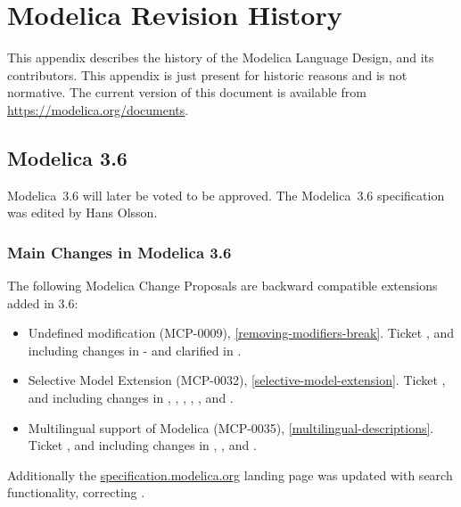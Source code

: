\chapter{Modelica Revision History}\label{modelica-revision-history}

This appendix describes the history of the Modelica Language Design, and its contributors.
This appendix is just present for historic reasons and is not normative.
The current version of this document is available from \url{https://modelica.org/documents}.

\section{Modelica 3.6}\label{modelica-3-6}

Modelica~3.6 will later be voted to be approved.
The Modelica~3.6 specification was edited by Hans Olsson.

\subsection{Main Changes in Modelica 3.6}\label{main-changes-in-modelica-3-6}

The following Modelica Change Proposals are backward compatible extensions added in 3.6:
\begin{itemize}
\item Undefined modification (MCP-0009), \cref{removing-modifiers-break}.
Ticket , and including changes in  - and clarified in .
\item Selective Model Extension (MCP-0032), \cref{selective-model-extension}.
Ticket , and including changes in , , , , , and .
\item Multilingual support of Modelica (MCP-0035), \cref{multilingual-descriptions}.
Ticket , and including changes in , , and .
\end{itemize}

Additionally the \url{specification.modelica.org} landing page was updated with search functionality,  correcting .

